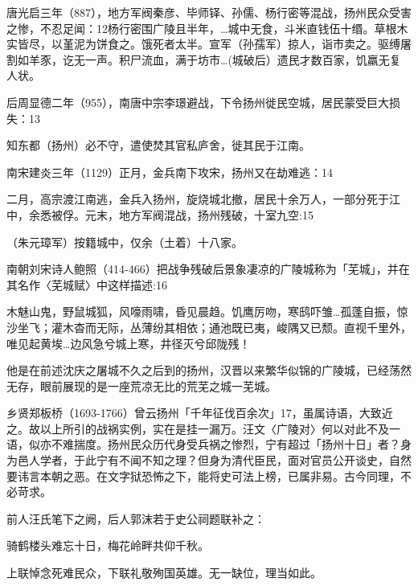 唐光启三年（887），地方军阀秦彦、毕师铎、孙儒、杨行密等混战，扬州民众受害之惨，不忍足闻：12杨行密围广陵且半年，…城中无食，斗米直钱伍十缗。草根木实皆尽，以堇泥为饼食之。饿死者太半。宣军（孙孺军）掠人，诣市卖之。驱缚屠割如羊豕，讫无一声。积尸流血，满于坊市…(城破后）遗民才数百家，饥羸无复人状。

后周显德二年（955），南唐中宗李璟避战，下令扬州徙民空城，居民蒙受巨大损失：13

知东都（扬州）必不守，遣使焚其官私庐舍，徙其民于江南。

南宋建炎三年（1129）正月，金兵南下攻宋，扬州又在劫难逃：14

二月，高宗渡江南逃，金兵入扬州，旋烧城北撤，居民十余万人，一部分死于江中，余悉被俘。元末，地方军阀混战，扬州残破，十室九空:15

（朱元璋军）按籍城中，仅余（土着）十八家。

南朝刘宋诗人鲍照（414-466）把战争残破后景象凄凉的广陵城称为「芜城」，并在其名作〈芜城赋〉中这样描述:16

木魅山鬼，野鼠城狐，风嚎雨啸，昏见晨趋。饥鹰厉吻，寒鸱吓雏…孤蓬自振，惊沙坐飞；灌木杳而无际，丛薄纷其相依；通池既已夷，峻隅又已颓。直视千里外，唯见起黄埃…边风急兮城上寒，井径灭兮邱陇残！

他是在前述沈庆之屠城不久之后到的扬州，汉晋以来繁华似锦的广陵城，已经荡然无存，眼前展现的是一座荒凉无比的荒芜之城一芜城。

\vfill
\begin{BookNotes}
\end{BookNotes}

乡贤郑板桥（1693-1766）曾云扬州「千年征伐百余次」17，虽属诗语，大致近之。故以上所引的战祸实例，实在是挂一漏万。汪文〈广陵对〉何以对此不及一语，似亦不难揣度。扬州民众历代身受兵祸之惨烈，宁有超过「扬州十日」者？身为邑人学者，于此宁有不闻不知之理？但身为清代臣民，面对官员公开谈史，自然要讳言本朝之恶。在文字狱恐怖之下，能将史可法上榜，已属非易。古今同理，不必苛求。

前人汪氏笔下之阙，后人郭沫若于史公祠题联补之：

\begin{BookQuote}
骑鹤楼头难忘十日，梅花岭畔共仰千秋。
\end{BookQuote}

上联悼念死难民众，下联礼敬殉国英雄。无一缺位，理当如此。

